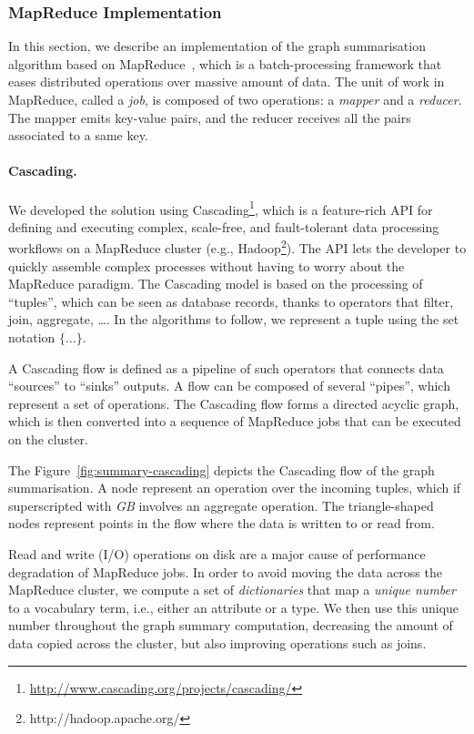 \subsubsection{MapReduce Implementation}

In this section, we describe an implementation of the graph summarisation algorithm based on MapReduce~\cite{dean:2004:msd}, which is a batch-processing framework that eases distributed operations over massive amount of data. The unit of work in MapReduce, called a \emph{job}, is composed of two operations: a \emph{mapper} and a \emph{reducer}. The mapper emits key-value pairs, and the reducer receives all the pairs associated to a same key.

\paragraph{Cascading.}

We developed the solution using Cascading\footnote{\url{http://www.cascading.org/projects/cascading/}}, which is a feature-rich API for defining and executing complex, scale-free, and fault-tolerant data processing workflows on a MapReduce cluster (e.g., Hadoop\footnote{http://hadoop.apache.org/}). The API lets the developer to quickly assemble complex processes without having to worry about the MapReduce paradigm. The Cascading model is based on the processing of ``tuples'', which can be seen as database records, thanks to operators that filter, join, aggregate, \ldots.  In the algorithms to follow, we represent a tuple using the set notation $\{\ldots\}$.

A Cascading flow is defined as a pipeline of such operators that connects data ``sources'' to ``sinks'' outputs. A flow can be composed of several ``pipes'', which represent a set of operations. The Cascading flow forms a directed acyclic graph, which is then converted into a sequence of MapReduce jobs that can be executed on the cluster.

The Figure~\ref{fig:summary-cascading} depicts the Cascading flow of the graph summarisation. A node represent an operation over the incoming tuples, which if superscripted with \emph{GB} involves an aggregate operation. The triangle-shaped nodes represent points in the flow where the data is written to or read from.


Read and write (I/O) operations on disk are a major cause of performance degradation of MapReduce jobs. In order to avoid moving the data across the MapReduce cluster, we compute a set of \emph{dictionaries} that map a \emph{unique number} to a vocabulary term, i.e., either an attribute or a type. We then use this unique number throughout the graph summary computation, decreasing the amount of data copied across the cluster, but also improving operations such as joins.

